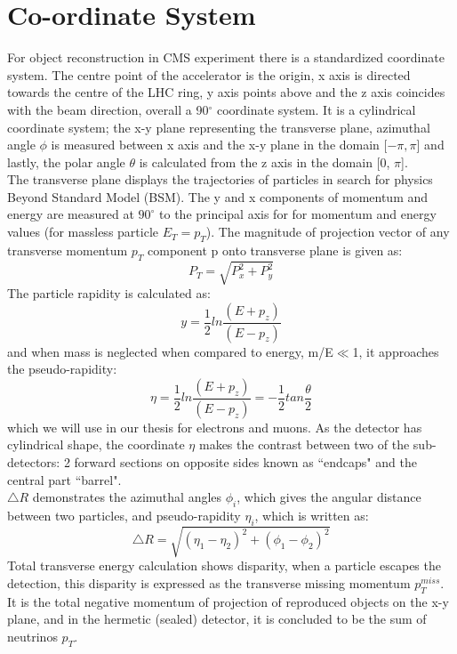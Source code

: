 \section{Co-ordinate System}
For object reconstruction in CMS experiment there is a standardized coordinate system. The centre point of the accelerator is the origin, x axis is directed towards the centre of the LHC ring, y axis points above and the z axis coincides with the beam direction, overall a 90$^{\circ}$ coordinate system. It is a cylindrical coordinate system; the x-y plane representing the transverse plane, azimuthal angle $\phi$ is measured between x axis and the x-y plane in the domain [$-\pi,\pi$] and lastly, the polar angle $\theta$ is calculated from the z axis in the domain [0, $\pi$].\\
The transverse plane displays the trajectories of particles in search for physics Beyond Standard Model (BSM). The y and x components of momentum and energy are measured at $90^{\circ}$ to the principal axis for for momentum and energy values (for massless particle $E_{T} = p_{T}$). The magnitude of projection vector of any transverse momentum $p_T$ component p onto transverse plane is given as:
\begin{equation}
    \label{eq1}
    P_{T} = \sqrt{P_{x}^{2}+P_{y}^{2}}
\end{equation}
The particle rapidity is calculated as:
\begin{equation}
    y = \frac{1}{2}ln\frac{(E+p_{z})}{(E-p_{z})}
\end{equation}
and when mass is neglected when compared to energy, m/E$\ll$1, it approaches the pseudo-rapidity:
\begin{equation}
    \eta = \frac{1}{2}ln\frac{(E+p_{z})}{(E-p_{z})} = -\frac{1}{2}tan\frac{\theta}{2}
    \end{equation}
which we will use in our thesis for electrons and muons. As the detector has cylindrical shape, the coordinate $\eta$ makes the contrast between two of the sub-detectors: 2 forward sections on opposite sides known as ``endcaps" and the central part ``barrel".\\
$\triangle R$ demonstrates the azimuthal angles $\phi_{i}$, which gives the angular distance between two particles, and pseudo-rapidity $\eta_{i}$, which is written as:
\begin{equation}
    \triangle R = \sqrt{(\eta_{1}-\eta_{2})^{2}+(\phi_{1}-\phi_{2})^{2}}
    \end{equation}
Total transverse energy calculation shows disparity, when a particle escapes the detection, this disparity is expressed as the transverse missing momentum $p^{miss}_{T}$. It is the total negative momentum of projection of reproduced objects on the x-y plane, and in the hermetic (sealed) detector, it is concluded to be the sum of neutrinos $p_T$. 